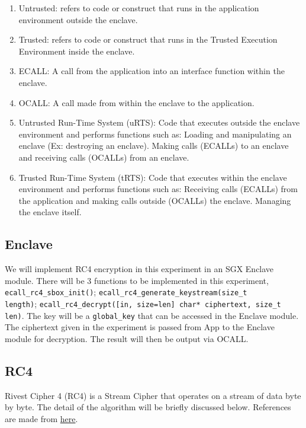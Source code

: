 \documentclass{article}
\newcommand{\code}[1]{\lstinline|#1|}
\begin{document}
\begin{enumerate}
      \item Untrusted: refers to code or construct that runs in the application environment
            outside the enclave.
      \item Trusted: refers to code or construct that runs in the Trusted Execution
            Environment inside the enclave.
      \item ECALL: A call from the application into an interface function within the
            enclave.
      \item OCALL: A call made from within the enclave to the application.
      \item Untrusted Run-Time System (uRTS): Code that executes outside the enclave
            environment and performs functions such as: Loading and manipulating an enclave
            (Ex: destroying an enclave). Making calls (ECALLs) to an enclave and receiving
            calls (OCALLs) from an enclave.
      \item Trusted Run-Time System (tRTS): Code that executes within the enclave
            environment and performs functions such as: Receiving calls (ECALLs) from the
            application and making calls outside (OCALLs) the enclave. Managing the enclave
            itself.
\end{enumerate}

\subsection*{Enclave}

We will implement RC4 encryption in this experiment in an SGX Enclave module.
There will be 3 functions to be implemented in this experiment,
\code{ecall_rc4_sbox_init()}; \code{ecall_rc4_generate_keystream(size_t
      length)}; \code{ecall_rc4_decrypt([in, size=len] char* ciphertext, size_t
      len)}. The key will be a \code{global_key} that can be accessed in the Enclave
module. The ciphertext given in the experiment is passed from App to the
Enclave module for decryption. The result will then be output via OCALL.

\subsection*{RC4}

Rivest Cipher 4 (RC4) is a Stream Cipher that operates on a stream of data byte
by byte. The detail of the algorithm will be briefly discussed below.
References are made from
\href{https://www.geeksforgeeks.org/what-is-rc4-encryption/}{here}.
\end{document}
